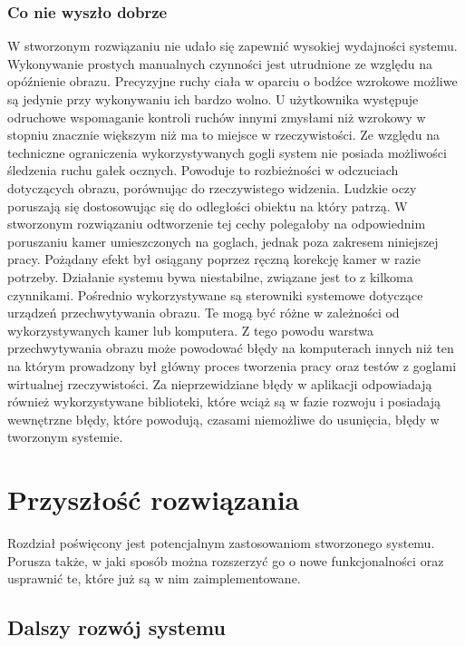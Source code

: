 \documentclass[a4paper,11pt,twoside]{report}
\theoremstyle{definition}
\begin{document}
\subsection{Co nie wyszło dobrze}

W stworzonym rozwiązaniu nie udało się zapewnić wysokiej wydajności systemu. Wykonywanie prostych manualnych czynności jest utrudnione ze względu na opóźnienie obrazu. Precyzyjne ruchy ciała w oparciu o bodźce wzrokowe możliwe są jedynie przy wykonywaniu ich bardzo wolno. U użytkownika występuje odruchowe wspomaganie kontroli ruchów innymi zmysłami niż wzrokowy w stopniu znacznie większym niż ma to miejsce w rzeczywistości. Ze względu na techniczne ograniczenia wykorzystywanych gogli system nie posiada możliwości śledzenia ruchu gałek ocznych. Powoduje to rozbieżności w odczuciach dotyczących obrazu, porównując do rzeczywistego widzenia. Ludzkie oczy poruszają się dostosowując się do odległości obiektu na który patrzą. W stworzonym rozwiązaniu odtworzenie tej cechy polegałoby na odpowiednim poruszaniu kamer umieszczonych na goglach, jednak poza zakresem niniejszej pracy. Pożądany efekt był osiągany poprzez ręczną korekcję kamer w razie potrzeby. Działanie systemu bywa niestabilne, związane jest to z kilkoma czynnikami. Pośrednio wykorzystywane są sterowniki systemowe dotyczące urządzeń przechwytywania obrazu. Te mogą być różne w zależności od wykorzystywanych kamer lub komputera. Z tego powodu warstwa przechwytywania obrazu może powodować błędy na komputerach innych niż ten na którym prowadzony był główny proces tworzenia pracy oraz testów z goglami wirtualnej rzeczywistości. Za nieprzewidziane błędy w aplikacji odpowiadają również wykorzystywane biblioteki, które wciąż są w fazie rozwoju i posiadają wewnętrzne błędy, które powodują, czasami niemożliwe do usunięcia, błędy w tworzonym systemie.

\chapter{Przyszłość rozwiązania}

Rozdział poświęcony jest potencjalnym zastosowaniom stworzonego systemu. Porusza także, w jaki sposób można rozszerzyć go o nowe funkcjonalności oraz usprawnić te, które już są w nim zaimplementowane.

\section{Dalszy rozwój systemu}
\end{document}
